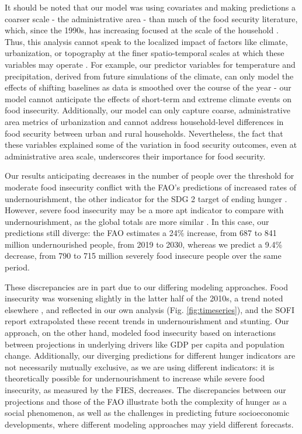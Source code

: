 \documentclass[titlepage]{article}
\begin{document}
It should be noted that our model was using covariates and making predictions a coarser scale - the administrative area - than much of the food security literature, which, since the 1990s, has increasing focused at the scale of the household \cite{Cooper2020}.  Thus, this analysis cannot speak to the localized impact of factors like climate, urbanization, or topography at the finer spatio-temporal scales at which these variables may operate \cite{Shukla2021, Blekking2020, Cockx2018, Tuholske2020}.  For example, our predictor variables for temperature and precipitation, derived from future simulations of the climate, can only model the effects of shifting baselines as data is smoothed over the course of the year - our model cannot anticipate the effects of short-term and extreme climate events on food insecurity.  Additionally, our model can only capture coarse, administrative area metrics of urbanization and cannot address household-level differences in food security between urban and rural households.  Nevertheless, the fact that these variables explained some of the variation in food security outcomes, even at administrative area scale, underscores their importance for food security.

Our results anticipating decreases in the number of people over the threshold for moderate food insecurity conflict with the FAO's predictions of increased rates of undernourishment, the other indicator for the SDG 2 target of ending hunger \cite[Part 1, Page 11]{sofi2020}.  However, severe food insecurity may be a more apt indicator to compare with undernourishment, as the global totals are more similar \cite{sofi2020}.  In this case, our predictions still diverge: the FAO estimates a 24\% increase, from 687 to 841 million undernourished people, from 2019 to 2030, whereas we predict a 9.4\% decrease, from 790 to 715 million severely food insecure people over the same period.

These discrepancies are in part due to our differing modeling approaches. Food insecurity was worsening slightly in the latter half of the 2010s, a trend noted elsewhere \cite{Voosen2020}, and reflected in our own analysis (Fig. \ref{fig:timeseries}), and the SOFI report extrapolated these recent trends in undernourishment and stunting.  Our approach, on the other hand, modeled food insecurity based on interactions between projections in underlying drivers like GDP per capita and population change.  Additionally, our diverging predictions for different hunger indicators are not necessarily mutually exclusive, as we are using different indicators: it is theoretically possible for undernourishment to increase while severe food insecurity, as measured by the FIES, decreases.  The discrepancies between our projections and those of the FAO illustrate both the complexity of hunger as a social phenomenon, as well as the challenges in predicting future socioeconomic developments, where different modeling approaches may yield different forecasts.
\end{document}
